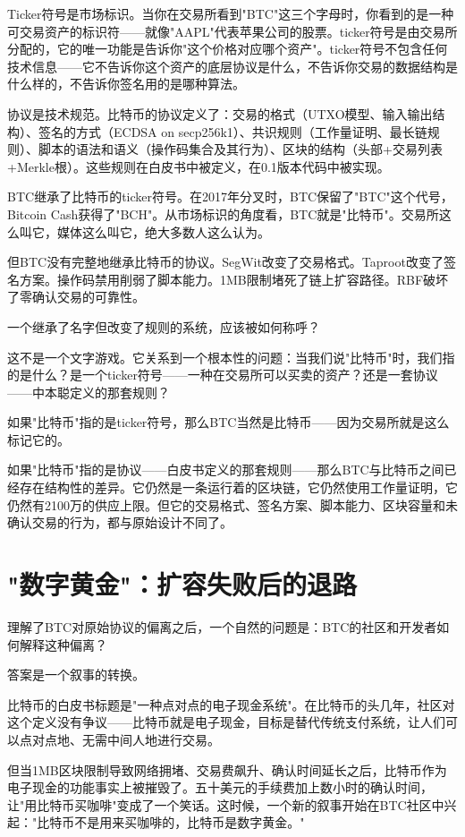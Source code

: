 \documentclass[a4paper,12pt,openany]{ctexbook}
\begin{document}
Ticker符号是市场标识。当你在交易所看到"BTC"这三个字母时，你看到的是一种可交易资产的标识符——就像"AAPL"代表苹果公司的股票。ticker符号是由交易所分配的，它的唯一功能是告诉你"这个价格对应哪个资产"。ticker符号不包含任何技术信息——它不告诉你这个资产的底层协议是什么，不告诉你交易的数据结构是什么样的，不告诉你签名用的是哪种算法。

协议是技术规范。比特币的协议定义了：交易的格式（UTXO模型、输入输出结构）、签名的方式（ECDSA on secp256k1）、共识规则（工作量证明、最长链规则）、脚本的语法和语义（操作码集合及其行为）、区块的结构（头部+交易列表+Merkle根）。这些规则在白皮书中被定义，在0.1版本代码中被实现。

BTC继承了比特币的ticker符号。在2017年分叉时，BTC保留了"BTC"这个代号，Bitcoin Cash获得了"BCH"。从市场标识的角度看，BTC就是"比特币"。交易所这么叫它，媒体这么叫它，绝大多数人这么认为。

但BTC没有完整地继承比特币的协议。SegWit改变了交易格式。Taproot改变了签名方案。操作码禁用削弱了脚本能力。1MB限制堵死了链上扩容路径。RBF破坏了零确认交易的可靠性。

一个继承了名字但改变了规则的系统，应该被如何称呼？

这不是一个文字游戏。它关系到一个根本性的问题：当我们说"比特币"时，我们指的是什么？是一个ticker符号——一种在交易所可以买卖的资产？还是一套协议——中本聪定义的那套规则？

如果"比特币"指的是ticker符号，那么BTC当然是比特币——因为交易所就是这么标记它的。

如果"比特币"指的是协议——白皮书定义的那套规则——那么BTC与比特币之间已经存在结构性的差异。它仍然是一条运行着的区块链，它仍然使用工作量证明，它仍然有2100万的供应上限。但它的交易格式、签名方案、脚本能力、区块容量和未确认交易的行为，都与原始设计不同了。


\section*{"数字黄金"：扩容失败后的退路}


理解了BTC对原始协议的偏离之后，一个自然的问题是：BTC的社区和开发者如何解释这种偏离？

答案是一个叙事的转换。

比特币的白皮书标题是"一种点对点的电子现金系统"。在比特币的头几年，社区对这个定义没有争议——比特币就是电子现金，目标是替代传统支付系统，让人们可以点对点地、无需中间人地进行交易。

但当1MB区块限制导致网络拥堵、交易费飙升、确认时间延长之后，比特币作为电子现金的功能事实上被摧毁了。五十美元的手续费加上数小时的确认时间，让"用比特币买咖啡"变成了一个笑话。这时候，一个新的叙事开始在BTC社区中兴起："比特币不是用来买咖啡的，比特币是数字黄金。"
\end{document}
